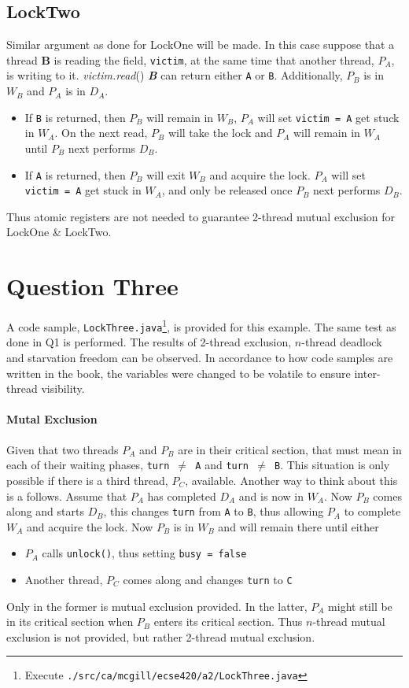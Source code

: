 \documentclass[12pt,letterpaper,titlepage]{article}
\newcommand{\methodcall}[4]{\textlangle{}\emph{#1.#2}(#3) \emph{\textbf{#4}}\textrangle{}}
\begin{document}
    \subsection{LockTwo}
    Similar argument as done for LockOne will be made. In this case suppose that a thread \textbf{B} is reading the field, \texttt{victim}, at the same time that another thread, $P_A$, is writing to it. \methodcall{victim}{read}{}{B} can return either \texttt{A} or \texttt{B}. Additionally, $P_B$ is in $W_B$ and $P_A$ is in $D_A$.
    \begin{itemize}
      \item If \texttt{B} is returned, then $P_B$ will remain in $W_B$, $P_A$ will set \texttt{victim = A} get stuck in $W_A$. On the next read, $P_B$ will take the lock and $P_A$ will remain in $W_A$ until $P_B$ next performs $D_B$.
      \item If \texttt{A} is returned, then $P_B$ will exit $W_B$ and acquire the lock. $P_A$ will set \texttt{victim = A} get stuck in $W_A$, and only be released once $P_B$ next performs $D_B$.
    \end{itemize}
    Thus atomic registers are not needed to guarantee 2-thread mutual exclusion for LockOne \& LockTwo.
  
  \section{Question Three}
    A code sample, \texttt{LockThree.java}\footnote{Execute \texttt{./src/ca/mcgill/ecse420/a2/LockThree.java}}, is provided for this example. The same test as done in Q1 is performed. The results of 2-thread exclusion, $ n $-thread deadlock and starvation freedom can be observed. In accordance to how code samples are written in the book, the variables were changed to be volatile to ensure inter-thread visibility.
  
    \paragraph{Mutal Exclusion} Given that two threads $P_A$ and $P_B$ are in their critical section, that must mean in each of their waiting phases, \texttt{turn $\not=$ A} and \texttt{turn $\not=$ B}. This situation is only possible if there is a third thread, $P_C$, available. Another way to think about this is a follows. Assume that $P_A$ has completed $D_A$ and is now in $W_A$. Now $P_B$ comes along and starts $D_B$, this changes \texttt{turn} from \texttt{A} to \texttt{B}, thus allowing $P_A$ to complete $W_A$ and acquire the lock. Now $P_B$ is in $W_B$ and will remain there until either
    \begin{itemize}
      \itemsep 0em
      \item $P_A$ calls \texttt{unlock()}, thus setting \texttt{busy = false}
      \item Another thread, $P_C$ comes along and changes \texttt{turn} to \texttt{C}
    \end{itemize}
    Only in the former is mutual exclusion provided. In the latter, $P_A$ might still be in its critical section when $P_B$ enters its critical section. Thus $ n $-thread mutual exclusion is not provided, but rather 2-thread mutual exclusion.
    
\end{document}
